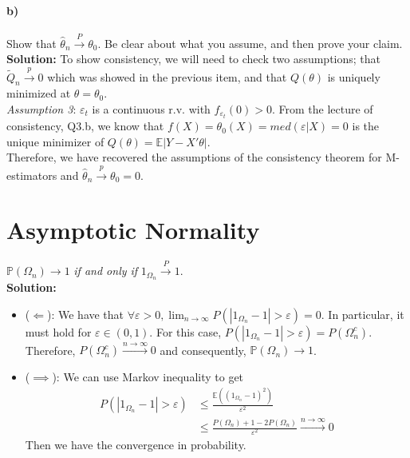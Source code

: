\documentclass[11pt,letterpaper]{article}                  %
\begin{document}
\begin{problem}
\paragraph{b)} Show that $\widehat{\theta}_n\overset{P}{\rightarrow}\theta_0$. Be clear about what you assume, and then prove your claim.\\

\textbf{Solution:} To show consistency, we will need to check two assumptions; that $\tilde{Q}_n \overset{p}{\rightarrow}0$ which was showed in the previous item, and that $Q(\theta)$ is uniquely minimized at $\theta=\theta_0$.\\
\textit{Assumption 3}: $\varepsilon_t$ is a continuous r.v. with $f_{\varepsilon_t}(0)>0$. From the lecture of consistency, Q3.b, we know that $f(X)=\theta_0(X)=med(\varepsilon|X)=0$ is the unique minimizer of $Q(\theta)=\mathbb{E}|Y-X'\theta|$.\\
Therefore, we have recovered the assumptions of the consistency theorem for M-estimators and $\hat{\theta}_n\overset{p}{\rightarrow}{\theta_0}=0$.
\end{problem}

\bigskip
\begin{problem}
\end{problem}

\section*{Asymptotic Normality}

\begin{problem}
$\mathbb{P}(\Omega_n)\rightarrow 1$ \textit{if and only if} $1_{\Omega_n} \overset{P}{\rightarrow}1$.\\

\textbf{Solution:}
\begin{itemize}
\item{($\Longleftarrow$)}: We have that $\forall \varepsilon>0, \lim_{n\to\infty} P(|1_{\Omega_n}-1|>\varepsilon)=0$. In particular, it must hold for $\varepsilon \in (0,1)$. For this case, $P(|1_{\Omega_n}-1|>\varepsilon)=P(\Omega_n^c)$. Therefore, $P(\Omega_n^c) \overset{n \to\infty}{\longrightarrow} 0$ and consequently, $\mathbb{P}(\Omega_n)\rightarrow 1$.

\item{($\implies$)}: We can use Markov inequality to get
\begin{align*}
P(|1_{\Omega_n}-1|>\varepsilon)&\leq \frac{\mathbb{E}((1_{\Omega_n}-1)^2)}{\varepsilon^2}\\
&\leq \frac{P(\Omega_n)+1-2P(\Omega_n)}{\varepsilon^2} \overset{n\to\infty}{\longrightarrow}0
\end{align*}
Then we have the convergence in probability.
\end{itemize}
\end{problem}
\end{document}
